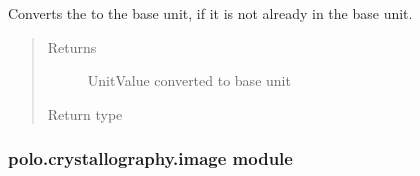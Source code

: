 \documentclass[letterpaper,10pt,english]{sphinxmanual}
\begin{document}
\begin{fulllineitems}
\begin{fulllineitems}
\label{\detokenize{polo.crystallography:polo.crystallography.cocktail.UnitValue.to_base}}
Converts the {\hyperref[\detokenize{polo.crystallography:polo.crystallography.cocktail.UnitValue.value}]{}}
to the base unit, if it is not already in the base unit.
\begin{quote}\begin{description}
\item[{Returns}] \leavevmode
UnitValue converted to base unit

\item[{Return type}] \leavevmode
{\hyperref[\detokenize{polo.crystallography:polo.crystallography.cocktail.UnitValue}]{}}

\end{description}\end{quote}

\end{fulllineitems}


\begin{fulllineitems}
\label{\detokenize{polo.crystallography:polo.crystallography.cocktail.UnitValue.value}}
\end{fulllineitems}


\end{fulllineitems}



\subsubsection{polo.crystallography.image module}
\label{\detokenize{polo.crystallography:module-polo.crystallography.image}}\label{\detokenize{polo.crystallography:polo-crystallography-image-module}}
\end{document}
